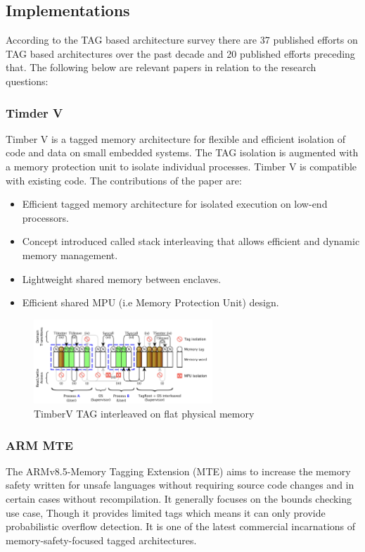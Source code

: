 \subsection{Implementations}
 
According to the TAG based architecture survey \cite{acmTAGSurvey} there are 37 published
efforts on TAG based architectures over the past decade and 20 published efforts preceding that. 
The following below are relevant papers in relation to the research questions: 

\subsubsection{Timder V}
 Timber V\cite{weiser_timber-v_2019} is a tagged memory architecture for flexible and efficient isolation of code and data on 
 small embedded systems. The TAG isolation is augmented with a memory protection unit to isolate 
 individual processes. Timber V is compatible with existing code. The contributions of the paper 
 are: 
 \begin{itemize}
  \item Efficient tagged memory architecture for isolated execution on low-end processors. 
  \item Concept introduced called stack interleaving that allows efficient and dynamic memory management. 
  \item Lightweight shared memory between enclaves. 
  \item Efficient shared MPU (i.e Memory Protection Unit) design. 
 \end{itemize}

 \begin{figure}[htbp!] 
  \centering
  \includegraphics[width=0.6\textwidth]{Timber-V}
  \caption[MTE]{TimberV TAG interleaved on flat physical memory\cite{weiser_timber-v_2019}}
  \label{fig:MTE}
  \end{figure}
	
\subsubsection{ARM MTE}
The ARMv8.5-Memory Tagging Extension (MTE)\cite{ARMMTE} aims to increase the memory safety written for 
unsafe languages without requiring source code changes and in certain cases without 
recompilation. It generally focuses on the bounds checking use case, Though it 
provides limited tags which means it can only provide probabilistic overflow detection. 
It is one of the latest commercial incarnations of memory-safety-focused tagged architectures.   

